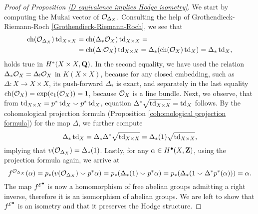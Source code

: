 \begin{proof}[Proof of Proposition \ref{D equivalence implies Hodge isometry}]
    We start by computing the Mukai vector of $\mathcal{O}_{\Delta_X}$. Consulting the help of Grothendieck-Riemann-Roch \ref{Grothendieck-Riemann-Roch}, we see that
    \begin{align*}
        \ch(\struct{\Delta_X}) \tdclass{X \times X} &= \ch(\Delta_*\struct{X})\tdclass{X \times X} = \\ &= \ch(\Delta_!\struct{X})\tdclass{X \times X} = \Delta_*(\ch(\struct{X}) \tdclass{X}) = \Delta_*\tdclass{X},
    \end{align*}
    holds true in $H^{*}(X \times X, \mathbf Q)$. In the second equality, we have used the relation $\Delta_*\mathcal{O}_{X} = \Delta_!\mathcal{O}_{X}$ in $K(X \times X)$, because for any closed embedding, such as $\Delta \colon X \to X \times X$, its push-forward $\Delta_*$ is exact, and separately in the last equality $\ch(\struct{X}) = \exp(\cclass[1](\struct{X})) = 1$, because $\mathcal{O}_{X}$ is a line bundle. Next, we observe, that from $\operatorname{td}_{X \times X} = p^*\operatorname{td}_{X} \smallsmile p^*\operatorname{td}_{X}$, equation $\Delta^*\sqrt{\operatorname{td}_{X\times X}} = \operatorname{td}_{X}$ follows. By the cohomological projection formula (\cf Proposition \ref{cohomological projection formula}) for the map $\Delta$, we further compute
    \[
        \Delta_*\operatorname{td}_{X} = \Delta_*\Delta^*\sqrt{\operatorname{td}_{X \times X}} = \Delta_*(1)\sqrt{\operatorname{td}_{X \times X}},
    \] 
    implying that $v(\mathcal{O}_{\Delta_X}) = \Delta_*(1)$. 
    Lastly, for any $\alpha \in H^{\bullet}(X, \mathbf Z)$, using the projection formula again, we arrive at
    \[
        f^{\mathcal{O}_{\Delta_X}}(\alpha) = p_*(v(\mathcal{O}_{\Delta_X})\smallsmile p^*\alpha) = p_*(\Delta_*(1)\smallsmile p^*\alpha) = p_*(\Delta_*(1\smallsmile \Delta^*p^*(\alpha))) = \alpha.
    \]
    The map $f^{\mathcal E^\bullet}$ is now a homomorphism of free abelian groups admitting a right inverse, therefore it is an isomorphism of abelian groups. We are left to show that $f^{\mathcal E^\bullet}$ is an isometry and that it preserves the Hodge structure. 
    

\end{proof}
